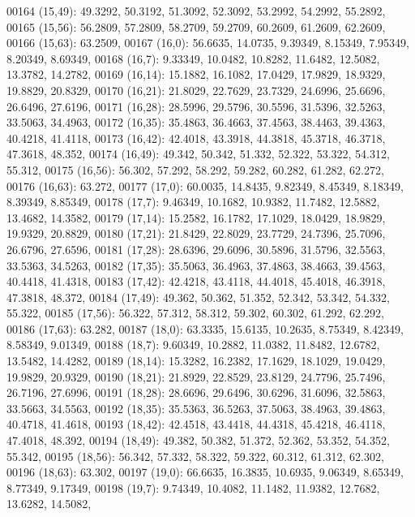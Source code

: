 \begin{DoxyCode}
00164       (15,49): 49.3292, 50.3192, 51.3092, 52.3092, 53.2992, 54.2992, 55.2892,
00165       (15,56): 56.2809, 57.2809, 58.2709, 59.2709, 60.2609, 61.2609, 62.2609,
00166       (15,63): 63.2509,
00167       (16,0): 56.6635, 14.0735, 9.39349, 8.15349, 7.95349, 8.20349, 8.69349,
00168       (16,7): 9.33349, 10.0482, 10.8282, 11.6482, 12.5082, 13.3782, 14.2782,
00169       (16,14): 15.1882, 16.1082, 17.0429, 17.9829, 18.9329, 19.8829, 20.8329,
00170       (16,21): 21.8029, 22.7629, 23.7329, 24.6996, 25.6696, 26.6496, 27.6196,
00171       (16,28): 28.5996, 29.5796, 30.5596, 31.5396, 32.5263, 33.5063, 34.4963,
00172       (16,35): 35.4863, 36.4663, 37.4563, 38.4463, 39.4363, 40.4218, 41.4118,
00173       (16,42): 42.4018, 43.3918, 44.3818, 45.3718, 46.3718, 47.3618, 48.352,
00174       (16,49): 49.342, 50.342, 51.332, 52.322, 53.322, 54.312, 55.312,
00175       (16,56): 56.302, 57.292, 58.292, 59.282, 60.282, 61.282, 62.272,
00176       (16,63): 63.272,
00177       (17,0): 60.0035, 14.8435, 9.82349, 8.45349, 8.18349, 8.39349, 8.85349,
00178       (17,7): 9.46349, 10.1682, 10.9382, 11.7482, 12.5882, 13.4682, 14.3582,
00179       (17,14): 15.2582, 16.1782, 17.1029, 18.0429, 18.9829, 19.9329, 20.8829,
00180       (17,21): 21.8429, 22.8029, 23.7729, 24.7396, 25.7096, 26.6796, 27.6596,
00181       (17,28): 28.6396, 29.6096, 30.5896, 31.5796, 32.5563, 33.5363, 34.5263,
00182       (17,35): 35.5063, 36.4963, 37.4863, 38.4663, 39.4563, 40.4418, 41.4318,
00183       (17,42): 42.4218, 43.4118, 44.4018, 45.4018, 46.3918, 47.3818, 48.372,
00184       (17,49): 49.362, 50.362, 51.352, 52.342, 53.342, 54.332, 55.322,
00185       (17,56): 56.322, 57.312, 58.312, 59.302, 60.302, 61.292, 62.292,
00186       (17,63): 63.282,
00187       (18,0): 63.3335, 15.6135, 10.2635, 8.75349, 8.42349, 8.58349, 9.01349,
00188       (18,7): 9.60349, 10.2882, 11.0382, 11.8482, 12.6782, 13.5482, 14.4282,
00189       (18,14): 15.3282, 16.2382, 17.1629, 18.1029, 19.0429, 19.9829, 20.9329,
00190       (18,21): 21.8929, 22.8529, 23.8129, 24.7796, 25.7496, 26.7196, 27.6996,
00191       (18,28): 28.6696, 29.6496, 30.6296, 31.6096, 32.5863, 33.5663, 34.5563,
00192       (18,35): 35.5363, 36.5263, 37.5063, 38.4963, 39.4863, 40.4718, 41.4618,
00193       (18,42): 42.4518, 43.4418, 44.4318, 45.4218, 46.4118, 47.4018, 48.392,
00194       (18,49): 49.382, 50.382, 51.372, 52.362, 53.352, 54.352, 55.342,
00195       (18,56): 56.342, 57.332, 58.322, 59.322, 60.312, 61.312, 62.302,
00196       (18,63): 63.302,
00197       (19,0): 66.6635, 16.3835, 10.6935, 9.06349, 8.65349, 8.77349, 9.17349,
00198       (19,7): 9.74349, 10.4082, 11.1482, 11.9382, 12.7682, 13.6282, 14.5082,

\end{DoxyCode}
